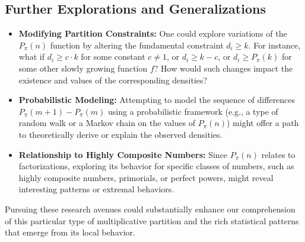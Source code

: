 \documentclass[]{article}
\theoremstyle{plain}%
\theoremstyle{definition}
\theoremstyle{remark}
\begin{document}
	\subsection{Further Explorations and Generalizations}
	\begin{itemize}
		\item \textbf{Modifying Partition Constraints:} One could explore variations of the $P_{\pi}(n)$ function by altering the fundamental constraint $d_i \ge k$. For instance, what if $d_i \ge c \cdot k$ for some constant $c \neq 1$, or $d_i \ge k-c$, or $d_i \ge P_{\pi}(k)$ for some other slowly growing function $f$? How would such changes impact the existence and values of the corresponding densities?
		\item \textbf{Probabilistic Modeling:} Attempting to model the sequence of differences $P_{\pi}(m+1) - P_{\pi}(m)$ using a probabilistic framework (e.g., a type of random walk or a Markov chain on the values of $P_{\pi}(n)$) might offer a path to theoretically derive or explain the observed densities.
		\item \textbf{Relationship to Highly Composite Numbers:} Since $P_{\pi}(n)$ relates to factorizations, exploring its behavior for specific classes of numbers, such as highly composite numbers, primorials, or perfect powers, might reveal interesting patterns or extremal behaviors.
	\end{itemize}
	
	Pursuing these research avenues could substantially enhance our comprehension of this particular type of multiplicative partition and the rich statistical patterns that emerge from its local behavior.
	
\end{document}
